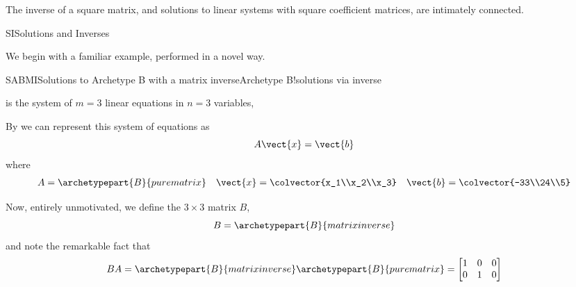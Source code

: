 %
\begin{introduction}
\begin{para}The inverse of a square matrix, and solutions to linear systems with square coefficient matrices, are intimately connected.\end{para}
\end{introduction}
%
\begin{subsect}{SI}{Solutions and Inverses}
%
\begin{para}We begin with a familiar example, performed in a novel way.\end{para}
%
\begin{example}{SABMI}{Solutions to Archetype B with a matrix inverse}{Archetype B!solutions via inverse}
%
\begin{para} is the system of $m=3$ linear equations in $n=3$ variables,
%
\end{para}
%
\begin{para}By  we can represent this system of equations as
%
\begin{equation*}
A\vect{x}=\vect{b}
\end{equation*}
%
where
%
\begin{align*}
A=\archetypepart{B}{purematrix}&&\vect{x}=\colvector{x_1\\x_2\\x_3}&&\vect{b}=\colvector{-33\\24\\5}
\end{align*}
\end{para}
%
\begin{para}Now, entirely unmotivated, we define the $3\times 3$ matrix $B$,
%
\begin{equation*}
B=\archetypepart{B}{matrixinverse}\end{equation*}
%
and note the remarkable fact that
%
\begin{equation*}
BA=\archetypepart{B}{matrixinverse}\archetypepart{B}{purematrix}=
\begin{bmatrix}
1 & 0 & 0\\
0 & 1 & 0\\

\end{bmatrix}
\end{equation*}
\end{para}
\end{example}
\end{subsect}
